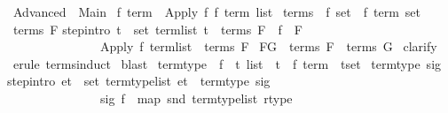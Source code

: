 %
\begin{isabellebody}%
\def\isabellecontext{Advanced}%
\isanewline
{}\ Advanced\ {\isacharequal}\ Main{\isacharcolon}\isanewline
\isanewline
{}\ {\isacharprime}f\ {\isachardoublequote}term{\isachardoublequote}\ {\isacharequal}\ Apply\ {\isacharprime}f\ {\isachardoublequote}{\isacharprime}f\ term\ list{\isachardoublequote}\isanewline
\isanewline
{}\ terms\ {\isacharcolon}{\isacharcolon}\ {\isachardoublequote}{\isacharprime}f\ set\ {\isasymRightarrow}\ {\isacharprime}f\ term\ set{\isachardoublequote}\isanewline
{}\ {\isachardoublequote}terms\ F{\isachardoublequote}\isanewline
{}\isanewline
step{\isacharbrackleft}intro{\isacharbrackright}{\isacharcolon}\ {\isachardoublequote}{\isasymlbrakk}{\isasymforall}t\ {\isasymin}\ set\ term{\isacharunderscore}list{\isachardot}\ t\ {\isasymin}\ terms\ F{\isacharsemicolon}\ \ f\ {\isasymin}\ F{\isasymrbrakk}\isanewline
\ \ \ \ \ \ \ \ \ \ \ \ \ \ {\isasymLongrightarrow}\ {\isacharparenleft}Apply\ f\ term{\isacharunderscore}list{\isacharparenright}\ {\isasymin}\ terms\ F{\isachardoublequote}\isanewline
\isanewline
\isanewline
{}\ {\isachardoublequote}F{\isasymsubseteq}G\ {\isasymLongrightarrow}\ terms\ F\ {\isasymsubseteq}\ terms\ G{\isachardoublequote}\isanewline
{}\ clarify\isanewline
{}\ {\isacharparenleft}erule\ terms{\isachardot}induct{\isacharparenright}\isanewline
{}\ blast\isanewline
{}\isanewline
\isanewline
{}\ term{\isacharunderscore}type\ {\isacharcolon}{\isacharcolon}\ {\isachardoublequote}{\isacharparenleft}{\isacharprime}f\ {\isasymRightarrow}\ {\isacharprime}t\ list\ {\isacharasterisk}\ {\isacharprime}t{\isacharparenright}\ {\isasymRightarrow}\ {\isacharparenleft}{\isacharprime}f\ term\ {\isacharasterisk}\ {\isacharprime}t{\isacharparenright}set{\isachardoublequote}\isanewline
{}\ {\isachardoublequote}term{\isacharunderscore}type\ sig{\isachardoublequote}\isanewline
{}\isanewline
step{\isacharbrackleft}intro{\isacharbrackright}{\isacharcolon}\ {\isachardoublequote}{\isasymlbrakk}{\isasymforall}et\ {\isasymin}\ set\ term{\isacharunderscore}type{\isacharunderscore}list{\isachardot}\ et\ {\isasymin}\ term{\isacharunderscore}type\ sig{\isacharsemicolon}\ \isanewline
\ \ \ \ \ \ \ \ \ \ \ \ \ \ \ sig\ f\ {\isacharequal}\ {\isacharparenleft}map\ snd\ term{\isacharunderscore}type{\isacharunderscore}list{\isacharcomma}\ rtype{\isacharparenright}{\isasymrbrakk}\isanewline

\end{isabellebody}
